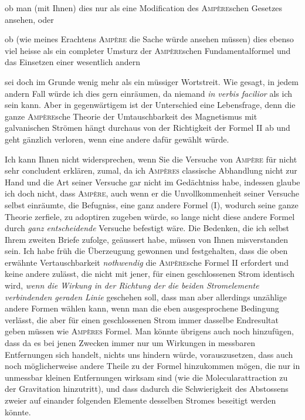 ob man (mit Ihnen) dies nur als eine Modification des \textsc{Ampère}schen Gesetzes ansehen, oder

ob (wie meines Erachtens \textsc{Ampère} die Sache würde ansehen müssen) dies ebenso viel heisse als ein completer Umsturz der \textsc{Ampère}schen Fundamentalformel und das Einsetzen einer wesentlich andern

sei doch im Grunde wenig mehr als ein müssiger Wortstreit. Wie gesagt, in jedem andern Fall würde ich dies gern einräumen, da niemand \textit{in verbis facilior} als ich sein kann. Aber in gegenwärtigem ist der Unterschied eine Lebensfrage, denn die ganze \textsc{Ampère}sche Theorie der Umtauschbarkeit des Magnetismus mit galvanischen Strömen hängt durchaus von der Richtigkeit der Formel II ab und geht gänzlich verloren, wenn eine andere dafür gewählt würde.

Ich kann Ihnen nicht widersprechen, wenn Sie die Versuche von \textsc{Ampère} für nicht sehr concludent erklären, zumal, da ich \textsc{Ampères} classische Abhandlung nicht zur Hand und die Art seiner Versuche gar nicht im Gedächtniss habe, indessen glaube ich doch nicht, dass \textsc{Ampère}, auch wenn er die Unvollkommenheit seiner Versuche selbst einräumte, die Befugniss, eine ganz andere Formel (I), wodurch seine ganze Theorie zerfiele, zu adoptiren zugeben würde, so lange nicht diese andere Formel durch \textit{ganz entscheidende} Versuche befestigt wäre. Die Bedenken, die ich selbst Ihrem zweiten Briefe zufolge, geäussert habe, müssen von Ihnen misverstanden sein. Ich habe früh die Überzeugung gewonnen und festgehalten, dass die oben erwähnte Vertauschbarkeit \textit{nothwendig} die \textsc{Ampère}sche Formel II erfordert und keine andere zulässt, die nicht mit jener, für einen geschlossenen Strom identisch wird, \textit{wenn die Wirkung in der Richtung der die beiden Stromelemente verbindenden geraden Linie} geschehen soll, dass man aber allerdings unzählige andere Formen wählen kann, wenn man die eben ausgesprochene Bedingung verlässt, die aber für einen geschlossenen Strom immer dasselbe Endresultat geben müssen wie \textsc{Ampères} Formel. Man könnte übrigens auch noch hinzufügen, dass da es bei jenen Zwecken immer nur um Wirkungen in messbaren Entfernungen sich handelt, nichts uns hindern würde, vorauszusetzen, dass auch noch möglicherweise andere Theile zu der Formel hinzukommen mögen, die nur in unmessbar kleinen Entfernungen wirksam sind (wie die Molecularattraction zu der Gravitation hinzutritt), und dass dadurch die Schwierigkeit des Abstossens zweier auf einander folgenden Elemente desselben Stromes beseitigt werden könnte.

